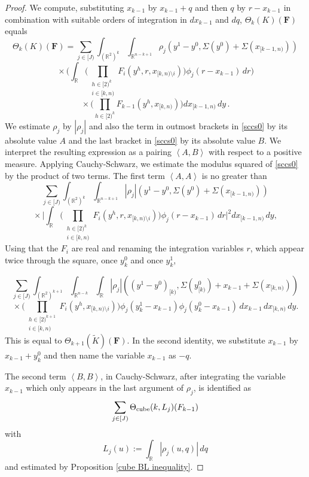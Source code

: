 \documentclass[12pt,reqno]{amsart}
\theoremstyle{plain}
\numberwithin{equation}{section}
\theoremstyle{remark}
\newcommand{\R}{{\mathbb R}}
\newcommand{\F}{\mathbf{F}}
\begin{document}
\begin{proof}
We compute, substituting $x_{k-1}$ by $x_{k-1}+q$ and then $q$ by $r-x_{k-1}$ in combination with suitable orders of integration in $dx_{k-1}$ and $dq$, $\Theta_k(K)(\F)$ equals
\begin{equation}\label{sccs0}
\Theta_k(K)(\F)=\sum_{j\in[J)} \int_{(\R^2)^k}\int_{\R^{n-k+1}}
\rho_j(y^1-y^0,\Sigma(y^0)+\Sigma(x_{[k-1,n)}))
\end{equation}
\[
{}\times
\Big(
\int_\R
\Big(
\prod_{\substack{h\in[2)^k\\ i\in[k,n)}}
F_{i}(y^h,r,x_{[k,n)\setminus i})
\Big)
\phi_j(r-x_{k-1})\,dr
\Big)
\]
\[
{}\times
\Big(
\prod_{h\in[2)^k}F_{k-1}(y^h,x_{[k,n)})
\Big)
dx_{[k-1,n)}\,dy\, .
\]
We estimate $\rho_j$ by $|\rho_j|$ and also the term in outmost brackets in \eqref{sccs0} by its absolute value $A$
and the last bracket in \eqref{sccs0} by its absolute value $B$.
We interpret the resulting expression as a pairing $\left< A , B \right>$ with respect to a positive measure.
Applying Cauchy-Schwarz, we estimate the modulus squared of \eqref{sccs0} by the product of two terms.
The first term $\left< A , A \right>$ is no greater than
\[
\sum_{j\in[J)}\int_{(\R^2)^k}\int_{\R^{n-k+1}}
|\rho_j|(y^1-y^0,\Sigma(y^0)+\Sigma(x_{[k-1,n)}))
\]
\[
{}\times
\Big|
\int_\R
\Big(
\prod_{\substack{h\in[2)^k\\ i\in[k,n)}}
F_{i}(y^h,r,x_{[k,n)\setminus i})
\Big)
\phi_j(r-x_{k-1})\,dr
\Big|^2
dx_{[k-1,n)}\,dy,
\]
Using that the $F_i$ are real and renaming the integration variables $r$, which appear twice
through the square, once $y_k^0$ and once $y_k^1$,

\[
\sum_{j\in[J)}\int_{(\R^2)^{k+1}}\int_{\R^{n-k}}
\int_\R
|\rho_j|((y^1-y^0)_{[k)},\Sigma(y^0_{[k)})+x_{k-1}+\Sigma(x_{[k,n)}))
\]
\[
{}\times
\Big(
\prod_{\substack{h\in[2)^{k+1}\\ i\in[k,n)}}
F_{i}(y^h,x_{[k,n)\setminus i})
\Big)
\phi_j(y_k^1-x_{k-1})\phi_j(y_k^0-x_{k-1})
\,dx_{k-1}\,dx_{[k,n)}\,dy.
\]
This is equal to $\Theta_{k+1}(\tilde{K})(\F)$.
In the second identity, we substitute
$x_{k-1}$ by $x_{k-1}+y_k^0$ and then name the variable $x_{k-1}$ as $-q$.

The second term $\left< B , B \right>$, in Cauchy-Schwarz, after integrating the variable $x_{k-1}$ which only appears in the last argument of $\rho_j$,
is identified as
\begin{equation}
    \sum_{j\in[J)} \Theta_{\rm cube}(k,L_j)(F_{k-1})
\end{equation}
with
\begin{equation}
    L_j(u):=\int_\R |\rho_j(u,q)|\,dq
\end{equation}
and estimated by Proposition \ref{cube BL inequality}.
\end{proof}
\end{document}
